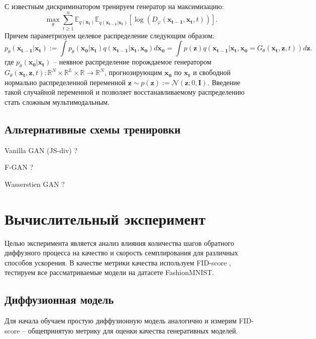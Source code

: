 \documentclass{article}
\begin{document}
С известным дискриминатором тренируем генератор на максимизацию:
 \begin{equation}
	\max\limits_\theta\sum\limits_{t\geqslant 1}^n \mathbb{E}_{q(\mathbf{x_t})}\mathbb{E}_{q(\mathbf{x_{t-1}}|\mathbf{x_t})}[\log{(D_\varphi(\mathbf{x_{t-1}}, \mathbf{x_t}, t))}].
\end{equation}
Причем параметризуем целевое распределение следующим образом:
 \begin{equation}
	p_\theta(\mathbf{x_{t-1}}|\mathbf{x_t}) := \int p_\theta(\mathbf{x_0}|\mathbf{x_t})q(\mathbf{x_{t-1}}|\mathbf{x_t}, \mathbf{x_0})d\mathbf{x_0} =\int p(\mathbf{z})q(\mathbf{x_{t-1}}|\mathbf{x_t}, \mathbf{x_0} = G_\theta(\mathbf{x_t}, \mathbf{z}, t))d\mathbf{z}.
\end{equation}
где $p_\theta(\mathbf{x_0}|\mathbf{x_t})$ -- неявное распределение порождаемое генератором $G_\theta(\mathbf{x_t}, \mathbf{z}, t):\mathbb{R}^N\times\mathbb{R}^L\times\mathbb{R}\to \mathbb{R}^N$, прогнозирующим $\mathbf{x_0}$ по $\mathbf{x_t}$ и свободной нормально распределенной переменной $\mathbf{z}\sim p(\mathbf{z}) := \mathcal{N}(\mathbf{z}; 0, \mathbf{I})$. Введение такой случайной переменной и позволяет восстанавливаемому распределению стать сложным мультимодальным.

\subsection{Альтернативные схемы тренировки}

Vanilla GAN (JS-div) ?

F-GAN ? 

Wasserstien GAN ?







 \section{Вычислительный эксперимент}
Целью эксперимента является анализ влияния количества шагов обратного диффузного процесса на качество и скорость семплирования для различных способов ускорения. В качестве метрики качества используем FID-score \cite{https://doi.org/10.48550/arxiv.1706.08500}, тестируем все рассматриваемые модели на датасете FashionMNIST. 


\subsection{Диффузионная модель}
Для начала обучаем простую диффузионную модель аналогично \cite{https://doi.org/10.48550/arxiv.2006.11239} и измерим FID-score -- общепринятую метрику для оценки качества генеративных моделей.
\end{document}
